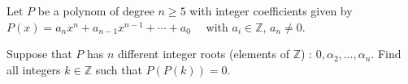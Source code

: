 Let $P$ be a polynom of degree $n \geq 5$ with integer coefficients given by $P(x)=a_{n}x^n+a_{n-1}x^{n-1}+\cdots+a_0 \quad$ with $a_i \in \mathbb{Z}$,  $a_n \neq 0$.

Suppose that $P$ has $n$ different integer roots (elements of $\mathbb{Z}$) : $0,\alpha_2,\ldots,\alpha_n$. Find all integers $k \in \mathbb{Z}$ such that $P(P(k))=0$.